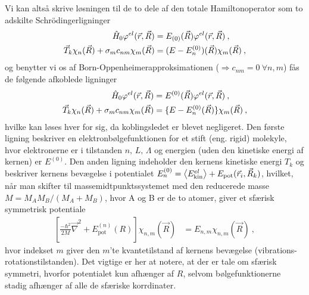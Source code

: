 Vi kan altså skrive løsningen til de to dele af den totale Hamiltonoperator som to adskilte Schrödingerligninger
\begin{align}
    \Hat{H}_0 \phi^{el}(\Vec{r}, \Vec{R}) &= E_{(0)}(\Vec{R})\phi^{el}(\Vec{r}, \Vec{R}) \: , \\
    \Vec{T}_k \chi_n(\Vec{R}) + \sigma_m c_{nm} \chi_m(\Vec{R}) &= (E - E_n^{(0)})(\Vec{R}) \chi_m(\Vec{R}) \: ,
\end{align}
og benytter vi os af Born-Oppenheimerapproksimationen ($\Rightarrow c_{nm} = 0 \: \forall n,m$) fås de følgende afkoblede ligninger
\begin{align}
    \Hat{H}_0 \phi^{el}(\Vec{r}, \Vec{R}) &= E^{(0)}(\Vec{R})\phi^{el}(\Vec{r}, \Vec{R}) \: , \\
    \Vec{T}_k \chi_n(\Vec{R}) + \sigma_m c_{nm} \chi_m(\Vec{R}) &= \{E - E_n^{(0)}(\Vec{R})\} \chi_m(\Vec{R}) \: ,
\end{align}
hvilke kan løses hver for sig, da koblingsledet er blevet negligeret.
Den første ligning beskriver en elektronbølgefunktionen for et stift (eng. rigid) molekyle, hvor elektronerne er i tilstanden $n,\, L,\, \Lambda$ og energien (uden den kinetiske energi af kernen) er $E^{(0)}$. Den anden ligning indeholder den kernens kinetiske energi $T_k$ og beskriver kernens bevægelse i potentialet $E_n^{(0)} = \braket{E_\text{kin}^{el}} + E_\text{pot}(\Vec{r}_i, \Vec{R}_k)$, hvilket, når man skifter til massemidtpunktssystemet med den reducerede masse $M = M_A M_B / (M_A + M_B)$, hvor A og B er de to atomer, giver et sfærisk symmetrisk potentiale
\begin{align} \label{eq:Q20_EquationWithSphericalSymmetricPotential}
    \left[\frac{-\hbar^2}{2M}\Vec{\nabla}^2 + E_\text{pot}^{(n)}(R)\right] \chi_{n,m}(\Vec{R}) &= E_{n,m}\chi_{n,m}(\Vec{R}) \: ,
\end{align}
hvor indekset $m$ giver den $m$'te kvantetilstand af kernens bevægelse (vibrations-rotationstilstanden). Det vigtige er her at notere, at der er tale om sfærisk symmetri, hvorfor potentialet kun afhænger af $R$, selvom bølgefunktionerne stadig afhænger af alle de sfæriske korrdinater.

